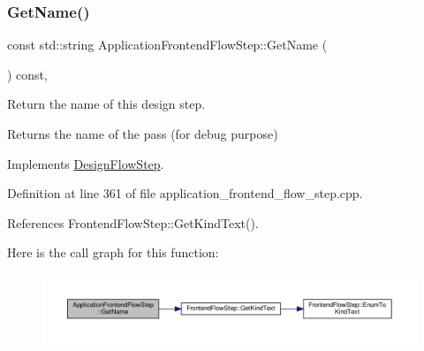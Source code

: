 \mbox{\label{classApplicationFrontendFlowStep_adc8a9e4cf2fd49e1f0d2270955f474f8}} 
\subsubsection{\texorpdfstring{Get\+Name()}{GetName()}}
{\footnotesize\ttfamily const std\+::string Application\+Frontend\+Flow\+Step\+::\+Get\+Name (\begin{DoxyParamCaption}{ }\end{DoxyParamCaption}) const\hspace{0.3cm}{\ttfamily [override]}, {\ttfamily [virtual]}}



Return the name of this design step. 

\begin{DoxyReturn}{Returns}
the name of the pass (for debug purpose) 
\end{DoxyReturn}


Implements \hyperlink{classDesignFlowStep_a01e5ebfab88db3b3b7f832f80075fad8}{Design\+Flow\+Step}.



Definition at line 361 of file application\+\_\+frontend\+\_\+flow\+\_\+step.\+cpp.



References Frontend\+Flow\+Step\+::\+Get\+Kind\+Text().

Here is the call graph for this function\+:
\nopagebreak
\begin{figure}[H]
\begin{center}
\leavevmode
\includegraphics[width=350pt]{d7/d7f/classApplicationFrontendFlowStep_adc8a9e4cf2fd49e1f0d2270955f474f8_cgraph}
\end{center}
\end{figure}
\mbox{\label{classApplicationFrontendFlowStep_a25500677dc27a20d35bdb4b45bfdba42}} 
